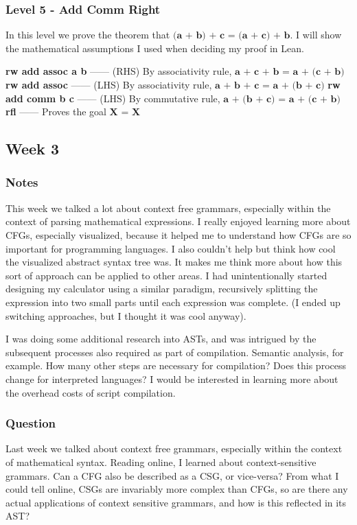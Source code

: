 \documentclass{article}
\theoremstyle{theorem}
\theoremstyle{definition}
\theoremstyle{remark}
\begin{document}
  \subsubsection*{Level 5 - Add Comm Right}
  In this level we prove the theorem that $\textbf{(a + b) + c = (a + c) + b}$. I will show the mathematical assumptions I used when deciding my proof in Lean.

  \bgroup\obeylines
  \qquad \textbf{rw add assoc a b} —— (RHS) By associativity rule, $\textbf{a + c + b = a + (c + b)}$
  \qquad \textbf{rw add assoc} —— (LHS) By associativity rule, $\textbf{a + b + c = a + (b + c)}$
  \qquad \textbf{rw add comm b c} —— (LHS) By commutative rule, $\textbf{a + (b + c) = a + (c + b)}$
  \qquad \textbf{rfl} —— Proves the goal $\textbf{X = X}$
  \egroup

\subsection{Week 3}

\subsubsection*{Notes}
This week we talked a lot about context free grammars, especially within the context of parsing mathematical expressions. I really enjoyed learning more about CFGs, especially visualized, because it helped me to understand how CFGs are so important for programming languages. I also couldn't help but think how cool the visualized abstract syntax tree was. It makes me think more about how this sort of approach can be applied to other areas. I had unintentionally started designing my calculator using a similar paradigm, recursively splitting the expression into two small parts until each expression was complete. (I ended up switching approaches, but I thought it was cool anyway).

I was doing some additional research into ASTs, and was intrigued by the subsequent processes also required as part of compilation. Semantic analysis, for example. How many other steps are necessary for compilation? Does this process change for interpreted languages? I would be interested in learning more about the overhead costs of script compilation.

\subsubsection*{Question} Last week we talked about context free grammars, especially within the context of mathematical syntax. Reading online, I learned about context-sensitive grammars. Can a CFG also be described as a CSG, or vice-versa? From what I could tell online, CSGs are invariably more complex than CFGs, so are there any actual applications of context sensitive grammars, and how is this reflected in its AST?
\end{document}
